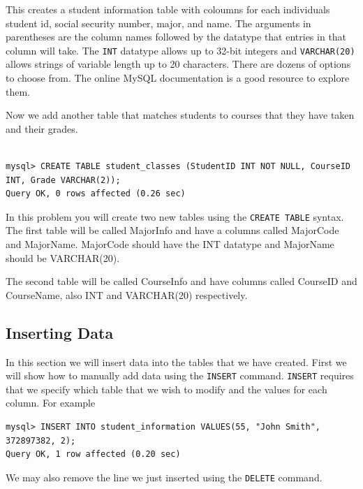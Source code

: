 This creates a student information table with coloumns for each individuals student id, social security number, major, and name.  The arguments in parentheses are the column names followed by the datatype that entries in that column will take.  The {\tt INT} datatype allows up to 32-bit integers and {\tt VARCHAR(20)} allows strings of variable length up to 20 characters.  There are dozens of options to choose from.  The online MySQL documentation is a good resource to explore them.

Now we add another table that matches students to courses that they have taken and their grades.

\begin{lstlisting}

mysql> CREATE TABLE student_classes (StudentID INT NOT NULL, CourseID INT, Grade VARCHAR(2));
Query OK, 0 rows affected (0.26 sec)

\end{lstlisting}

\begin{problem}

In this problem you will create two new tables using the {\tt CREATE TABLE} syntax.  The first table will be called MajorInfo and have a columns called MajorCode and MajorName.  MajorCode should have the INT datatype and MajorName should be VARCHAR(20).

The second table will be called CourseInfo and have columns called CourseID and CourseName, also INT and VARCHAR(20) respectively.

\end{problem}

\subsection{Inserting Data}

In this section we will insert data into the tables that we have created.  First we will show how to manually add data using the {\tt INSERT} command.  {\tt INSERT} requires that we specify which table that we wish to modify and the values for each column.  For example

\begin{lstlisting}
mysql> INSERT INTO student_information VALUES(55, "John Smith", 372897382, 2);
Query OK, 1 row affected (0.20 sec)
\end{lstlisting}

We may also remove the line we just inserted using the {\tt DELETE} command.


